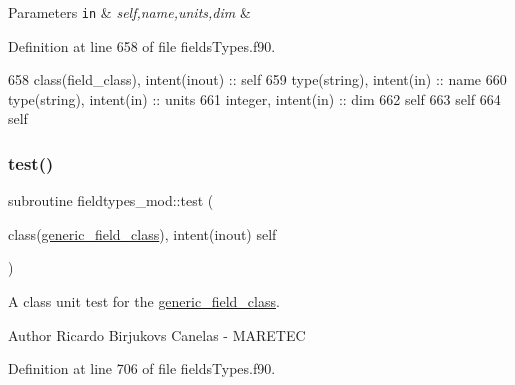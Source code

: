 \begin{DoxyParams}[1]{Parameters}
\mbox{\tt in}  & {\em self,name,units,dim} & \\
\hline
\end{DoxyParams}


Definition at line 658 of file fields\+Types.\+f90.


\begin{DoxyCode}
658     \textcolor{keywordtype}{class}(field\_class), \textcolor{keywordtype}{intent(inout)} :: self
659     \textcolor{keywordtype}{type}(string), \textcolor{keywordtype}{intent(in)} :: name
660     \textcolor{keywordtype}{type}(string), \textcolor{keywordtype}{intent(in)} :: units
661     \textcolor{keywordtype}{integer}, \textcolor{keywordtype}{intent(in)} :: dim
662     self%
663     self%
664     self%
\end{DoxyCode}
\mbox{\label{namespacefieldtypes__mod_a0babd6327ed77199d5437d17de34bafe}} 
\subsubsection{\texorpdfstring{test()}{test()}}
{\footnotesize\ttfamily subroutine fieldtypes\+\_\+mod\+::test (\begin{DoxyParamCaption}\item[{class(\mbox{\hyperlink{structfieldtypes__mod_1_1generic__field__class}{generic\+\_\+field\+\_\+class}}), intent(inout)}]{self }\end{DoxyParamCaption})\hspace{0.3cm}{\ttfamily [private]}}



A class \textquotesingle{}unit\textquotesingle{} test for the \mbox{\hyperlink{structfieldtypes__mod_1_1generic__field__class}{generic\+\_\+field\+\_\+class}}. 

\begin{DoxyAuthor}{Author}
Ricardo Birjukovs Canelas -\/ M\+A\+R\+E\+T\+EC 
\end{DoxyAuthor}


Definition at line 706 of file fields\+Types.\+f90.



